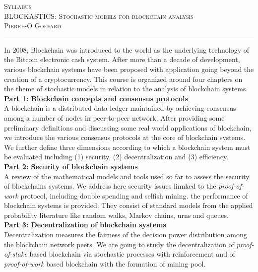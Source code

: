 \documentclass[11pt]{article}
\def\title{Syllabus}
\def\course{BLOCKASTICS: Stochastic models for blockchain analysis }
\def\profName{Pierre-O Goffard }
\begin{document}
{\center \textsc{\Large \title\\
	\large\course\\
	 \profName %
	}\\
	\vspace*{2em}
	\hrule
\vspace*{2em}}

In 2008, Blockchain was introduced to the world as the underlying technology of the Bitcoin electronic cash system. After more than a decade of development, various blockchain systems have been proposed with application going beyond the creation of a cryptocurrency. This course is organized around four chapters on the theme of stochastic models in relation to the analysis of blockchain systems. 
\\

\noindent \textbf{Part 1: Blockchain concepts and consensus protocols}\\
\noindent A blockchain is a distributed data ledger maintained by achieving consensus among a number of nodes in peer-to-peer network. After providing some preliminary definitions and discussing some real world applications of blockchain, we introduce the various consensus protocols at the core of blockchain systems. We further define three dimensions according to which a blockchain system must be evaluated including (1) security, (2) decentralization and (3) efficiency.    
\\

\noindent \textbf{Part 2: Security of blockchain systems}\\
\noindent A review of the mathematical models and tools used so far to assess the security of blockchains systems. We address here security issues linnked to the \textit{proof-of-work} protocol, including double spending and selfish mining.
the performance of blockchain systems is provided. They consist of standard models from the applied probability literature like random walks, Markov chains, urns and queues.
\\

\noindent \textbf{Part 3: Decentralization of blockchain systems}\\
\noindent Decentralization measures the fairness of the decision power distribution among the blockchain network peers. We are going to study the decentralization of \textit{proof-of-stake} based blockchain via stochastic processes with reinforcement and of \textit{proof-of-work} based blockchain with the formation of mining pool.       
\\
\end{document}
